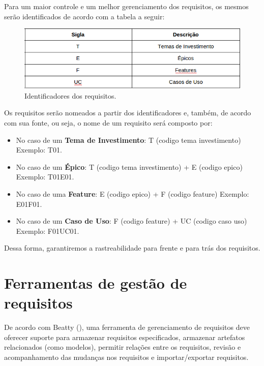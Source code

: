     Para um maior controle e um melhor gerenciamento dos requisitos, 
    os mesmos serão identificados de acordo com a tabela a seguir:
  
    \begin{figure}[!htbp]
      \centering
      \includegraphics[scale=0.7]{editaveis/figuras/identificadores_requisitos}
      \caption[Identificadores dos requisitos]{Identificadores dos requisitos. \footnotemark}
      \label{identificadores_requisitos}
    \end{figure}
  
    Os requisitos serão nomeados a partir dos identificadores e, também, de acordo com sua fonte, ou seja, 
    o nome de um requisito será composto por:
  
    \begin{itemize}
      \item No caso de um \textbf{Tema de Investimento}: T (codigo tema investimento) Exemplo: T01.
      \item No caso de um \textbf{Épico}: T (codigo tema investimento) + E (codigo epico) Exemplo: T01E01.
      \item No caso de uma \textbf{Feature}: E (codigo epico) + F (codigo feature) Exemplo: E01F01.
      \item No caso de um \textbf{Caso de Uso}:  F (codigo feature) + UC (codigo caso uso) Exemplo: F01UC01.
    \end{itemize}

    Dessa forma, garantiremos a rastreabilidade para frente e para trás dos requisitos.
  
  \section{Ferramentas de gestão de requisitos}
    
    De acordo com Beatty (\citeyear{beatty13}), uma ferramenta de gerenciamento de requisitos deve oferecer
    suporte para armazenar requisitos especificados, armazenar artefatos relacionados (como modelos), permitir relações
    entre os requisitos, revisão e acompanhamento das mudanças nos requisitos e importar/exportar requisitos.
    
